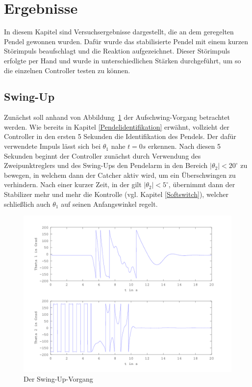 \section{Ergebnisse}
\label{sec.Ergebnisse}
In diesem Kapitel sind Versuchsergebnisse dargestellt, die an dem geregelten Pendel gewonnen wurden. Dafür wurde das stabilisierte Pendel mit einem kurzen Störimpuls beaufschlagt und die Reaktion aufgezeichnet. Dieser Störimpuls erfolgte per Hand und wurde in unterschiedlichen Stärken durchgeführt, um so die einzelnen Controller testen zu können. 
\subsection{Swing-Up}
Zunächst soll anhand von Abbildung~\ref{fig.Swing-Up-Plot} der Aufschwing-Vorgang betrachtet werden. Wie bereits in Kapitel \ref{Pendelidentifikation} erwähnt, vollzieht der Controller in den ersten 5 Sekunden die Identifikation des Pendels. Der dafür verwendete Impuls lässt sich bei $\theta_1$ nahe $t=0s$ erkennen. Nach diesen 5 Sekunden beginnt der Controller zunächst durch Verwendung des Zweipunktreglers und des Swing-Ups den Pendelarm in den Bereich $\left| \theta_2 \right| < 20^\circ$ zu bewegen, in welchem dann der Catcher aktiv wird, um ein Überschwingen zu verhindern. Nach einer kurzer Zeit, in der gilt $\left| \theta_2 \right| < 5^\circ$, übernimmt dann der Stabilizer mehr und mehr die Kontrolle (vgl. Kapitel \ref{Softswitch}), welcher schließlich auch $\theta_1$ auf seinen Anfangswinkel regelt.

\begin{figure}[htbp]
	\centering
	\includegraphics[width=1.\textwidth]{Grafiken/Swingup_kurz.png}
	\caption{Der Swing-Up-Vorgang}
	\label{fig.Swing-Up-Plot}
\end{figure}



